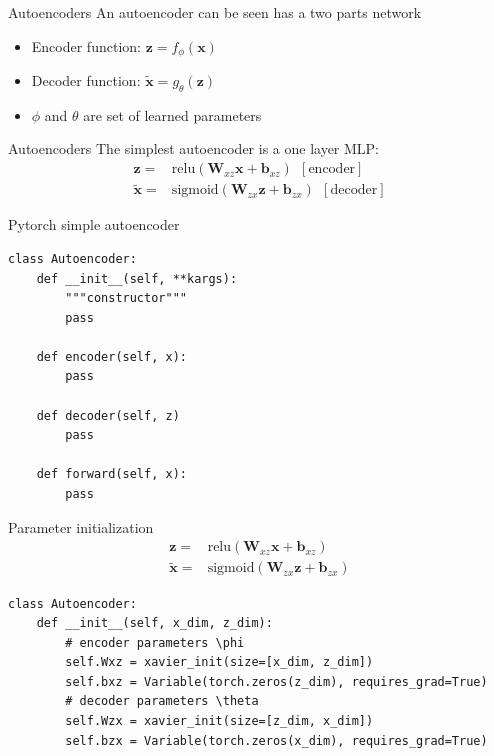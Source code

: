 \documentclass{beamer}
\newcommand{\relu}{\mathrm{relu}}
\newcommand{\sig}{\mathrm{sigmoid}}
\begin{document}
\begin{frame}{Autoencoders}
An autoencoder can be seen has a two parts network
\begin{itemize}
	\item Encoder function: $\bm{z}=f_\phi(\bm{x})$ \pause
	\item Decoder function: $\tilde{\bm{x}} = g_\theta(\bm{z})$ \pause
	\item $\phi$ and $\theta$ are set of learned parameters \pause
\end{itemize}
\end{frame}

\begin{frame}{Autoencoders}
	The simplest autoencoder is a one layer MLP:
	\Large
	\begin{equation}
	\begin{split}
		\mathbf{z} =& \relu\left(\mathbf{W}_{xz}\mathbf{x}+\mathbf{b}_{xz}\right)~~[\text{encoder}]\\
		\tilde{\mathbf{x}} =& \sig\left(\mathbf{W}_{zx}\mathbf{z}+\mathbf{b}_{zx}\right)~~[\text{decoder}]
	\end{split}
	\end{equation}
\end{frame}

\begin{frame}[fragile]{Pytorch simple autoencoder}
\begin{verbatim}
class Autoencoder:
	def __init__(self, **kargs):
	    """constructor"""
	    pass
	
	def encoder(self, x):
	    pass
	
	def decoder(self, z)
	    pass
	    
	def forward(self, x):
	    pass
\end{verbatim}
\end{frame}

\begin{frame}[fragile]{Parameter initialization}
\begin{equation}
\begin{split}
\mathbf{z} =& \relu\left(\mathbf{W}_{xz}\mathbf{x}+\mathbf{b}_{xz}\right)\\
\tilde{\mathbf{x}} =& \sig\left(\mathbf{W}_{zx}\mathbf{z}+\mathbf{b}_{zx}\right) 
\end{split}
\end{equation}
\begin{verbatim}
class Autoencoder:
    def __init__(self, x_dim, z_dim):
        # encoder parameters \phi
        self.Wxz = xavier_init(size=[x_dim, z_dim])
        self.bxz = Variable(torch.zeros(z_dim), requires_grad=True)
        # decoder parameters \theta
        self.Wzx = xavier_init(size=[z_dim, x_dim])
        self.bzx = Variable(torch.zeros(x_dim), requires_grad=True)
\end{verbatim}
\end{frame}
\end{document}
